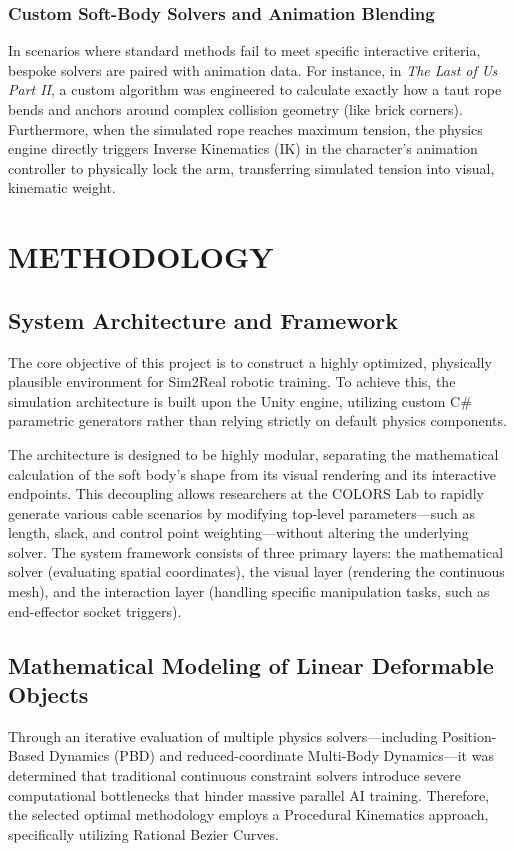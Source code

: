 \documentclass[a4paper,12pt]{report}
\begin{document}
\subsection{Custom Soft-Body Solvers and Animation Blending}
In scenarios where standard methods fail to meet specific interactive criteria, bespoke solvers are paired with animation data. For instance, in \textit{The Last of Us Part II}, a custom algorithm was engineered to calculate exactly how a taut rope bends and anchors around complex collision geometry (like brick corners). Furthermore, when the simulated rope reaches maximum tension, the physics engine directly triggers Inverse Kinematics (IK) in the character's animation controller to physically lock the arm, transferring simulated tension into visual, kinematic weight.
\chapter{METHODOLOGY}
\section{System Architecture and Framework}
The core objective of this project is to construct a highly optimized, physically plausible environment for Sim2Real robotic training. To achieve this, the simulation architecture is built upon the Unity engine, utilizing custom C\# parametric generators rather than relying strictly on default physics components. 

The architecture is designed to be highly modular, separating the mathematical calculation of the soft body's shape from its visual rendering and its interactive endpoints. This decoupling allows researchers at the COLORS Lab to rapidly generate various cable scenarios by modifying top-level parameters—such as length, slack, and control point weighting—without altering the underlying solver. The system framework consists of three primary layers: the mathematical solver (evaluating spatial coordinates), the visual layer (rendering the continuous mesh), and the interaction layer (handling specific manipulation tasks, such as end-effector socket triggers).

\section{Mathematical Modeling of Linear Deformable Objects}
Through an iterative evaluation of multiple physics solvers—including Position-Based Dynamics (PBD) and reduced-coordinate Multi-Body Dynamics—it was determined that traditional continuous constraint solvers introduce severe computational bottlenecks that hinder massive parallel AI training. Therefore, the selected optimal methodology employs a Procedural Kinematics approach, specifically utilizing Rational Bezier Curves.
\end{document}
